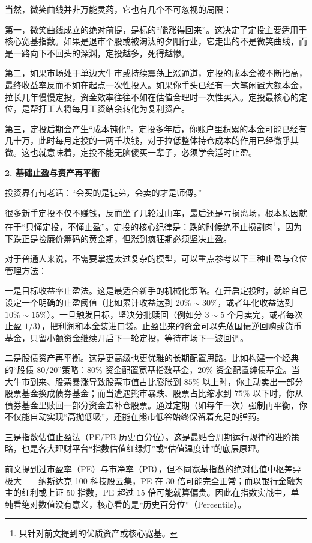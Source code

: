 \documentclass[12pt,openany]{book}
\newcommand{\subhead}[1]{%
    \par\vspace{0.5\baselineskip}%
    \noindent\textbf{#1}\par%
    \vspace{0.5\baselineskip}%
}
\begin{document}
当然，微笑曲线并非万能灵药，它也有几个不可忽视的局限：

第一，微笑曲线成立的绝对前提，是标的“能涨得回来”。这决定了定投主要适用于核心宽基指数。如果是退市个股或被淘汰的夕阳行业，它走出的不是微笑曲线，而是一路向下不回头的深渊，定投越多，死得越惨。

第二，如果市场处于单边大牛市或持续震荡上涨通道，定投的成本会被不断抬高，最终收益率反而不如在起点一次性投入。如果你手头已经有一大笔闲置大额本金，拉长几年慢慢定投，资金效率往往不如在估值合理时一次性买入。定投最核心的定位，是帮打工人将每月工资结余转化为复利资产。

第三，定投后期会产生“成本钝化”。定投多年后，你账户里积累的本金可能已经有几十万，此时每月定投的一两千块钱，对于拉低整体持仓成本的作用已经微乎其微。这也就意味着，定投不能无脑傻买一辈子，必须学会适时止盈。

\newpage

\subhead{2. 基础止盈与资产再平衡}

投资界有句老话：“会买的是徒弟，会卖的才是师傅。”

很多新手定投不仅不赚钱，反而坐了几轮过山车，最后还是亏损离场，根本原因就在于“只懂定投，不懂止盈”。定投的核心纪律是：跌的时候绝不止损割肉\footnote{只针对前文提到的优质资产或核心宽基。}，因为下跌正是捡廉价筹码的黄金期，但涨到疯狂期必须坚决止盈。

对于普通人来说，不需要掌握太过复杂的模型，可以重点参考以下三种止盈与仓位管理方法：

一是目标收益率止盈法。这是最适合新手的机械化策略。在开启定投时，就给自己设定一个明确的止盈阈值（比如累计收益达到 $20\%\sim 30\%$，或者年化收益达到 $10\%\sim 15\%$）。一旦触发目标，坚决分批赎回（例如分 $3\sim 5$ 个月卖完，或者每次止盈 $1/3$），把利润和本金装进口袋。止盈出来的资金可以先放国债逆回购或货币基金，只留小额资金继续开启下一轮定投，等待市场下一波回调。

二是股债资产再平衡。这是更高级也更优雅的长期配置思路。比如构建一个经典的“股债 $80/20$”策略：$80\%$ 资金配置宽基指数基金，$20\%$ 资金配置纯债基金。当大牛市到来、股票暴涨导致股票市值占比膨胀到 $85\%$ 以上时，你主动卖出一部分股票基金换成债券基金；而当遭遇熊市暴跌、股票占比缩水到 $75\%$ 以下时，你从债券基金里赎回一部分资金去补仓股票。通过定期（如每年一次）强制再平衡，你不仅能自动实现“高抛低吸”，还能在熊市低谷始终保留着充足的弹药。

三是指数估值止盈法（PE/PB 历史百分位）。这是最贴合周期运行规律的进阶策略，也是各大理财平台“指数估值红绿灯”或“估值温度计”的底层原理。

前文提到过市盈率（PE）与市净率（PB），但不同宽基指数的绝对估值中枢差异极大——纳斯达克 100 科技股云集，PE 在 $30$ 倍可能完全正常；而以银行金融为主的红利或上证 $50$ 指数，PE 超过 $15$ 倍可能就算偏贵。因此在指数实战中，单纯看绝对数值没有意义，核心看的是“历史百分位”（Percentile）。
\end{document}
